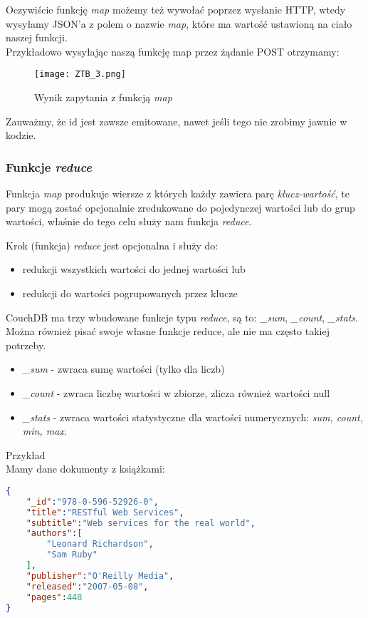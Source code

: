 \documentclass[a4paper,15pt]{article}
\newcommand{\issue}[2]{
    \begin{tcolorbox}[colback=issueColor!5!white,colframe=issueColor,title={Pamiętaj #1}]
        #2
    \end{tcolorbox}
}
\begin{document}
Oczywiście funkcję \textit{map} możemy też wywołać poprzez wysłanie HTTP, wtedy wysyłamy JSON'a z polem o nazwie \textit{map}, które ma wartość ustawioną na ciało naszej funkcji.  \\

Przykładowo wysyłając naszą funkcję map przez żądanie POST otrzymamy:
\begin{figure}[H]
\centering
  \texttt{[image: ZTB\_3.png]}
  \caption{Wynik zapytania z funkcją \textit{map}}
\end{figure}

Zauważmy, że id jest zawsze emitowane, nawet jeśli tego nie zrobimy jawnie w kodzie. 


\subsubsection{Funkcje \textit{reduce}}

Funkcja \textit{map} produkuje wiersze z których każdy zawiera parę \textit{klucz-wartość}, te pary mogą zostać opcjonalnie zredukowane do pojedynczej wartości lub do grup wartości, właśnie do tego celu służy nam funkcja \textit{reduce}. 

\issue{}{
Krok (funkcja) \textit{reduce} jest opcjonalna i służy do:
\begin{itemize}
\item redukcji wszystkich wartości do jednej wartości lub
\item redukcji do wartości pogrupowanych przez klucze 
\end{itemize}
} 

CouchDB ma trzy wbudowane funkcje typu \textit{reduce}, są to: \textit{\_sum}, \textit{\_count}, \textit{\_stats}. Można również pisać swoje własne funkcje reduce, ale nie ma często takiej potrzeby.

\begin{itemize}
\item \textit{\_sum} - zwraca sumę wartości (tylko dla liczb)
\item \textit{\_count} - zwraca liczbę wartości w zbiorze, zlicza również wartości null
\item \textit{\_stats} - zwraca wartości statystyczne dla wartości numerycznych: \textit{sum, count, min, max}.
\end{itemize}

Przykład \\

Mamy dane dokumenty z książkami:

\begin{lstlisting}[language=json,firstnumber=1]
{
	"_id":"978-0-596-52926-0",
	"title":"RESTful Web Services",
	"subtitle":"Web services for the real world",
	"authors":[
		"Leonard Richardson",
		"Sam Ruby"
	],
	"publisher":"O'Reilly Media",
	"released":"2007-05-08",
	"pages":448
}
\end{lstlisting}
\end{document}

